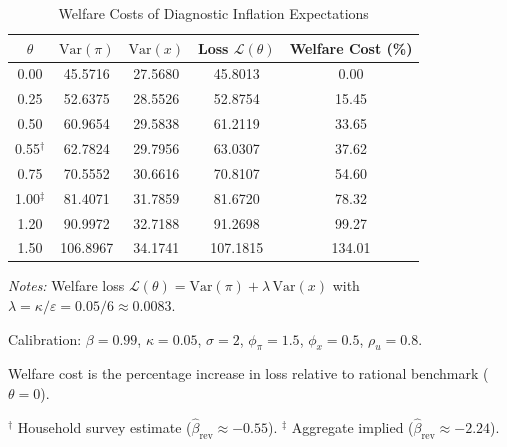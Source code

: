 \begin{table}[htbp]
\centering
\begin{threeparttable}
\caption{Welfare Costs of Diagnostic Inflation Expectations}
\label{tab:nk_welfare}
{\small
\begin{tabular}{ccccc}
\toprule
$\theta$ & $\mathrm{Var}(\pi)$ & $\mathrm{Var}(x)$ & Loss $\mathcal{L}(\theta)$ & Welfare Cost (\%) \\
\midrule
  0.00 & 45.5716 & 27.5680 & 45.8013 & 0.00 \\
  0.25 & 52.6375 & 28.5526 & 52.8754 & 15.45 \\
  0.50 & 60.9654 & 29.5838 & 61.2119 & 33.65 \\
  0.55$^{\dagger}$ & 62.7824 & 29.7956 & 63.0307 & 37.62 \\
  0.75 & 70.5552 & 30.6616 & 70.8107 & 54.60 \\
  1.00$^{\ddagger}$ & 81.4071 & 31.7859 & 81.6720 & 78.32 \\
  1.20 & 90.9972 & 32.7188 & 91.2698 & 99.27 \\
  1.50 & 106.8967 & 34.1741 & 107.1815 & 134.01 \\
\bottomrule
\end{tabular}
}
\begin{tablenotes}[flushleft]
\footnotesize
\item \textit{Notes:} Welfare loss $\mathcal{L}(\theta) = \mathrm{Var}(\pi) + \lambda \, \mathrm{Var}(x)$ with $\lambda = \kappa/\varepsilon = 0.05/6 \approx 0.0083$.
\item Calibration: $\beta=0.99$, $\kappa=0.05$, $\sigma=2$, $\phi_\pi=1.5$, $\phi_x=0.5$, $\rho_u=0.8$.
\item Welfare cost is the percentage increase in loss relative to rational benchmark ($\theta=0$).
\item $^{\dagger}$ Household survey estimate ($\hat{\beta}_{\mathrm{rev}} \approx -0.55$). $^{\ddagger}$ Aggregate implied ($\hat{\beta}_{\mathrm{rev}} \approx -2.24$).
\end{tablenotes}
\end{threeparttable}
\end{table}
